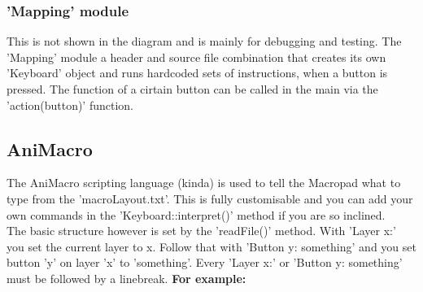 \documentclass[english, 12pt]{scrartcl}
\begin{document}
	\subsubsection{'Mapping' module}
	This is not shown in the diagram and is mainly for debugging and testing. The 'Mapping' module a header and source file combination that creates its own 'Keyboard' object and runs hardcoded sets of instructions, when a button is pressed. The function of a cirtain button can be called in the main via the 'action(button)' function.
	\subsection{AniMacro}
	The AniMacro scripting language (kinda) is used to tell the Macropad what to type from the 'macroLayout.txt'. This is fully customisable and you can add your own commands in the 'Keyboard::interpret()' method if you are so inclined.\\
	The basic structure however is set by the 'readFile()' method. With 'Layer x:' you set the current layer to x. Follow that with 'Button y: something' and you set button 'y' on layer 'x' to 'something'. Every 'Layer x:' or 'Button y: something' must be followed by a linebreak.\newline
	\textbf{For example:}\newline
	\noindent{}\newline
\end{document}
